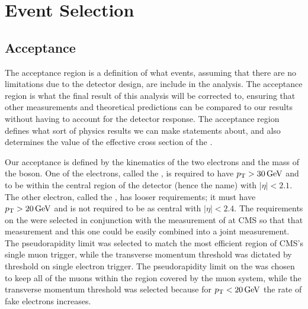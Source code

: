 \chapter{Event Selection}
\label{chapter:event_selection}


\section{Acceptance}
\label{sec:acceptance}


The acceptance region is a definition of what events, assuming that there are
no limitations due to the detector design, are include in the analysis. The
acceptance region is what the final result of this analysis will be corrected
to, ensuring that other measurements and theoretical predictions can be
compared to our results without having to account for the detector response.
The acceptance region defines what sort of physics results we can make
statements about, and also determines the value of the effective cross section
of the \Z.

Our acceptance is defined by the kinematics of the two electrons and the mass
of the \Z boson. One of the electrons, called the \CentralElectron, is required
to have $p_{\mathrm{T}} > 30 \,\text{Ge\hspace{-.08em}V}$ and to be within the central region of the detector
(hence the name) with $|\eta| < 2.1$. The other electron, called the
\ExtendedElectron, has looser requirements; it must have $p_{\mathrm{T}} > 20 \,\text{Ge\hspace{-.08em}V}$ and is
not required to be as central with $|\eta| < 2.4$. The requirements on the
\CentralElectron were selected in conjunction with the \Ztomumu measurement of
\phistar at CMS so that that measurement and this one could be easily combined
into a joint measurement. The pseudorapidity limit was selected to match the
most efficient region of CMS's single muon trigger, while the transverse
momentum threshold was dictated by threshold on single electron trigger. The
pseudorapidity limit on the \ExtendedElectron was chosen to keep all of the
muons within the region covered by the muon system, while the transverse
momentum threshold was selected because for $p_{\mathrm{T}} < 20 \,\text{Ge\hspace{-.08em}V}$ the rate of fake
electrons increases.

